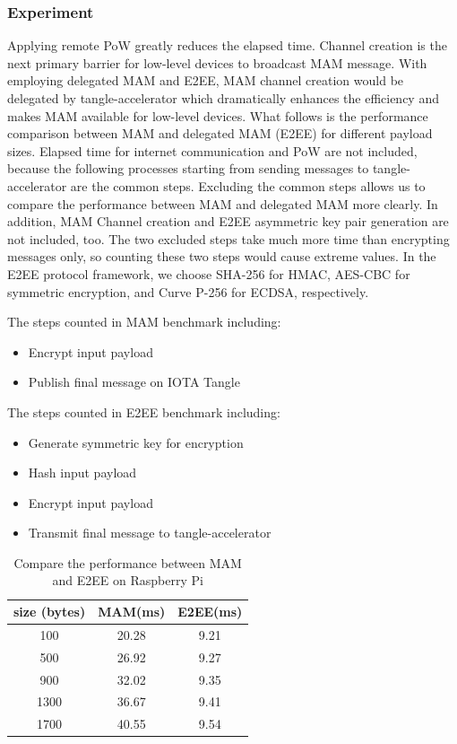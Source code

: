 \documentclass[conference]{IEEEtran}
\begin{document}
\subsubsection{Experiment}
Applying remote PoW greatly reduces the elapsed time. Channel creation is the next primary barrier for low-level devices to broadcast MAM message. With employing delegated MAM and E2EE, MAM channel creation would be delegated by tangle-accelerator which dramatically enhances the efficiency and makes MAM available for low-level devices. What follows is the performance comparison between MAM and delegated MAM (E2EE) for different payload sizes. Elapsed time for internet communication and PoW are not included, because the following processes starting from sending messages to tangle-accelerator are the common steps. Excluding the common steps allows us to compare the performance between MAM and delegated MAM more clearly. In addition, MAM Channel creation and E2EE asymmetric key pair generation are not included, too. The two excluded steps take much more time than encrypting messages only, so counting these two steps would cause extreme values. In the E2EE protocol framework, we choose SHA-256 for HMAC, AES-CBC for symmetric encryption, and Curve P-256 for ECDSA, respectively.

The steps counted in MAM benchmark including:
\begin{itemize}
    \item Encrypt input payload
    \item Publish final message on IOTA Tangle
\end{itemize}

The steps counted in E2EE benchmark including:
\begin{itemize}
    \item Generate symmetric key for encryption
    \item Hash input payload
    \item Encrypt input payload
    \item Transmit final message to tangle-accelerator
\end{itemize}

\begin{table}[htbp]
    \caption{Compare the performance between MAM and E2EE on Raspberry Pi}
    \label{tab:mam_vs_e2ee}
		\centering
        \begin{tabular}{|c||c|c|}
        \hline
            \textbf{size (bytes)} & \textbf{MAM(ms)} & \textbf{E2EE(ms)} \\
            \hline
            100 & 20.28 & 9.21 \\
            500 &  26.92 & 9.27 \\
            900 & 32.02 &  9.35  \\
            1300 & 36.67 & 9.41 \\
            1700 & 40.55 & 9.54 \\
            \hline
        \end{tabular}
\end{table}
\end{document}
